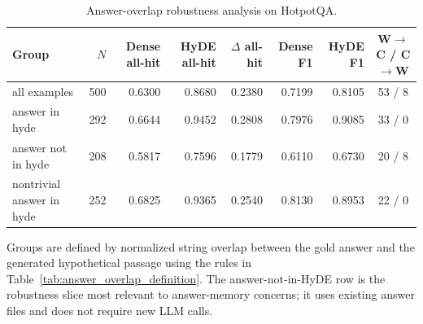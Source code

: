 \begin{table}[t]
\centering
\caption{Answer-overlap robustness analysis on HotpotQA.}
\label{tab:hyde_overlap_robustness}
\scriptsize
\begin{threeparttable}
\setlength{\tabcolsep}{3pt}
\begin{tabularx}{\textwidth}{>{\raggedright\arraybackslash}X r r r r r r c}
\toprule
Group & $N$ & Dense all-hit & HyDE all-hit & $\Delta$ all-hit & Dense F1 & HyDE F1 & W$\rightarrow$C / C$\rightarrow$W \\
\midrule
all examples & 500 & 0.6300 & 0.8680 & 0.2380 & 0.7199 & 0.8105 & 53 / 8 \\
answer in hyde & 292 & 0.6644 & 0.9452 & 0.2808 & 0.7976 & 0.9085 & 33 / 0 \\
answer not in hyde & 208 & 0.5817 & 0.7596 & 0.1779 & 0.6110 & 0.6730 & 20 / 8 \\
nontrivial answer in hyde & 252 & 0.6825 & 0.9365 & 0.2540 & 0.8130 & 0.8953 & 22 / 0 \\
\bottomrule
\end{tabularx}
\begin{tablenotes}
\footnotesize
\item Groups are defined by normalized string overlap between the gold answer and the generated hypothetical passage using the rules in Table~\ref{tab:answer_overlap_definition}. The answer-not-in-HyDE row is the robustness slice most relevant to answer-memory concerns; it uses existing answer files and does not require new LLM calls.
\end{tablenotes}
\end{threeparttable}
\end{table}
